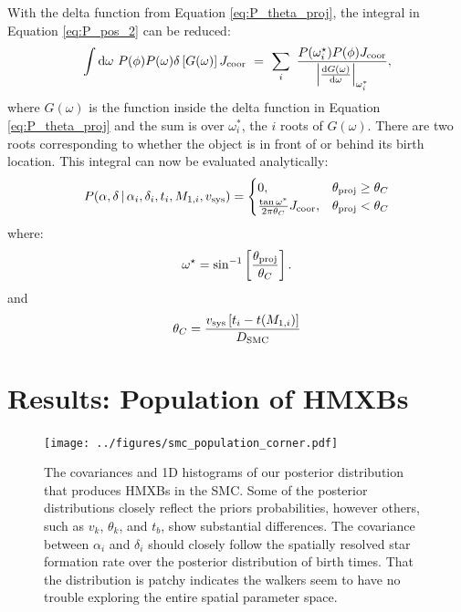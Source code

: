 \documentclass[12pt, preprint]{aastex}
\newcommand{\given}{\,|\,}
\newcommand{\dd}{\mathrm{d}}
\begin{document}
With the delta function from Equation \ref{eq:P_theta_proj}, the integral in Equation \ref{eq:P_pos_2} can be reduced:
\begin{equation}
\int \dd \omega\ P(\phi) P(\omega) \delta \left[ G(\omega) \right]  J_{\rm coor}\  =\ \sum_i\ \frac{P(\omega_i^{\star}) P(\phi)  J_{\rm coor}}{ \left| \frac{ \dd G (\omega) }{\dd \omega} \right|_{\omega_i^*}},
\end{equation}
where $G(\omega)$ is the function inside the delta function in Equation \ref{eq:P_theta_proj} and the sum is over $\omega_i^*$, the $i$ roots of $G(\omega)$. There are two roots corresponding to whether the object is in front of or behind its birth location. This integral can now be evaluated analytically:
\begin{equation}
P(\alpha, \delta \given \alpha_i, \delta_i, t_i, M_{1,i}, v_{\rm sys} ) =
\begin{cases} 
      0, & \theta_{\rm proj} \geq \theta_C\\
     \frac{\tan \omega^*}{2 \pi \theta_C}  J_{\rm coor}, & \theta_{\rm proj} < \theta_C 
   \end{cases}
\end{equation}
where:
\begin{equation}
\omega^{\star} = \sin^{-1} \left[ \frac{\theta_{\rm proj}}{\theta_C} \right].
\end{equation}
and
\begin{equation}
\theta_C = \frac{v_{\rm sys} \left[ t_i - t(M_{1,i}) \right]}{D_{\rm SMC}} \label{eq:theta_c}
\end{equation}




\section{Results: Population of HMXBs} \label{sec:results_population}


\begin{figure}[h!]
\begin{center}
\texttt{[image: ../figures/smc\_population\_corner.pdf]}
\caption{ The covariances and 1D histograms of our posterior distribution that produces HMXBs in the SMC. Some of the posterior distributions closely reflect the priors probabilities, however others, such as $v_k$, $\theta_k$, and $t_b$, show substantial differences. The covariance between $\alpha_i$ and $\delta_i$ should closely follow the spatially resolved star formation rate over the posterior distribution of birth times. That the distribution is patchy indicates the walkers seem to have no trouble exploring the entire spatial parameter space.}
\label{fig:population_corner}
\end{center}
\end{figure}
\end{document}
